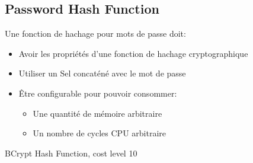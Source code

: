 

\subsection{Password Hash Function}
\begin{frame}
Une fonction de hachage pour mots de passe doit:
\begin{itemize}
    \item Avoir les propriétés d'une fonction de hachage cryptographique
    \item Utiliser un Sel concaténé avec le mot de passe
    \item Être configurable pour pouvoir consommer:
    \begin{itemize}
        \item Une quantité de mémoire arbitraire
        \item Un nombre de cycles CPU arbitraire
    \end{itemize}
\end{itemize}

\begin{center}
BCrypt Hash Function, cost level 10
\end{center}

\end{frame}

